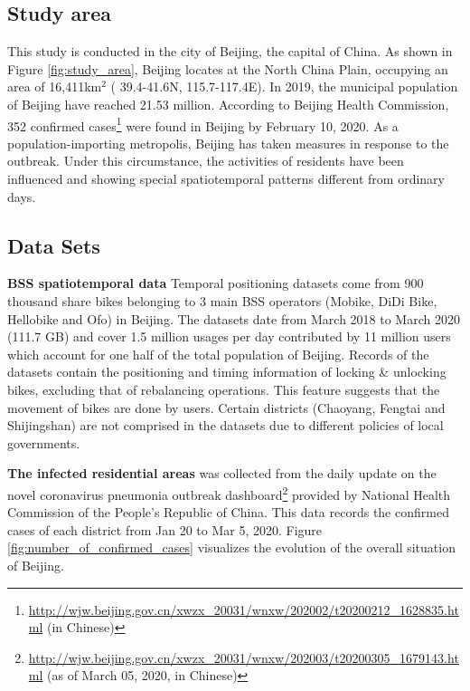 \documentclass[preprints,ijgi,submit,moreauthors]{Definitions/mdpi}
\begin{document}
\subsection{Study area}
This study is conducted in the city of Beijing, the capital of China. 
As shown in Figure \ref{fig:study_area}, Beijing locates at the North China Plain, occupying an area of 16,411km$^2$ ( 39.4{\degree}-41.6{\degree}N, 115.7{\degree}-117.4{\degree}E). 
In 2019, the municipal population of Beijing have reached 21.53 million. According to Beijing Health Commission, 352 confirmed cases\footnote{\url{http://wjw.beijing.gov.cn/xwzx_20031/wnxw/202002/t20200212_1628835.html} (in Chinese)} were found in Beijing by February 10, 2020. 
As a population-importing metropolis, Beijing has taken measures in response to the outbreak. 
Under this circumstance, the activities of residents have been influenced and showing special spatiotemporal patterns different from ordinary days.

\subsection{Data Sets}
\textbf{BSS spatiotemporal data} Temporal positioning datasets come from 900 thousand share bikes belonging to 3 main BSS operators (Mobike, DiDi Bike, Hellobike and Ofo) in Beijing.
The datasets date from March 2018 to March 2020 (111.7 GB) and cover 1.5 million usages per day contributed by 11 million users which account for one half of the total population of Beijing.
Records of the datasets contain the positioning and timing information of locking \& unlocking bikes, excluding that of rebalancing operations.
This feature suggests that the movement of bikes are done by users.
Certain districts (Chaoyang, Fengtai and Shijingshan) are not comprised in the datasets due to different policies of local governments.

\textbf{The infected residential areas} was collected from the daily update on the novel coronavirus pneumonia outbreak dashboard\footnote{\url{http://wjw.beijing.gov.cn/xwzx_20031/wnxw/202003/t20200305_1679143.html} (as of March 05, 2020, in Chinese)} provided by National Health Commission of the People's Republic of China. 
This data records the confirmed cases of each district from Jan 20 to Mar 5, 2020. 
Figure \ref{fig:number_of_confirmed_cases} visualizes the evolution of the overall situation of Beijing.
\end{document}
